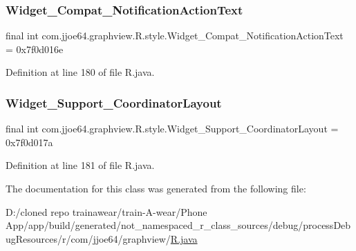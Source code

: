 \subsubsection{\texorpdfstring{Widget\_Compat\_NotificationActionText}{Widget\_Compat\_NotificationActionText}}
{\footnotesize\ttfamily final int com.\+jjoe64.\+graphview.\+R.\+style.\+Widget\+\_\+\+Compat\+\_\+\+Notification\+Action\+Text = 0x7f0d016e\hspace{0.3cm}{\ttfamily [static]}}



Definition at line 180 of file R.\+java.

\mbox{\label{classcom_1_1jjoe64_1_1graphview_1_1_r_1_1style_a8c4b92b0ea04897daa668bb79df7aa55}} 
\subsubsection{\texorpdfstring{Widget\_Support\_CoordinatorLayout}{Widget\_Support\_CoordinatorLayout}}
{\footnotesize\ttfamily final int com.\+jjoe64.\+graphview.\+R.\+style.\+Widget\+\_\+\+Support\+\_\+\+Coordinator\+Layout = 0x7f0d017a\hspace{0.3cm}{\ttfamily [static]}}



Definition at line 181 of file R.\+java.



The documentation for this class was generated from the following file\+:\begin{DoxyCompactItemize}
\item 
D\+:/cloned repo trainawear/train-\/\+A-\/wear/\+Phone App/app/build/generated/not\+\_\+namespaced\+\_\+r\+\_\+class\+\_\+sources/debug/process\+Debug\+Resources/r/com/jjoe64/graphview/\mbox{\hyperlink{process_debug_resources_2r_2com_2jjoe64_2graphview_2_r_8java}{R.\+java}}\end{DoxyCompactItemize}
